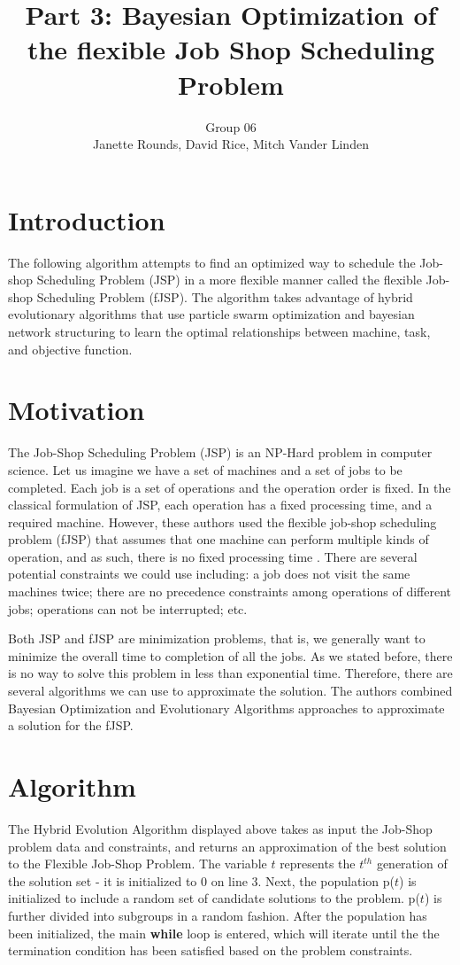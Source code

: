 \documentclass[11pt]{article}
\title{Part 3: Bayesian Optimization of the flexible Job Shop Scheduling Problem}
\author{Group 06 \\ 
\small Janette Rounds, \small David Rice, \small Mitch Vander Linden}
\begin{document}
\maketitle

\section{Introduction}
The following algorithm attempts to find an optimized way to schedule the Job-shop Scheduling Problem (JSP) in a more flexible manner called the flexible Job-shop Scheduling Problem (fJSP). The algorithm takes advantage of hybrid evolutionary algorithms that use particle swarm optimization and bayesian network structuring to learn the optimal relationships between machine, task, and objective function. 

\section{Motivation}
The Job-Shop Scheduling Problem (JSP) is an NP-Hard problem in computer science\cite{cheng1996tutorial}. Let us imagine we have a set of machines and a set of jobs to be completed. Each job is a set of operations and the operation order is fixed. In the classical formulation of JSP, each operation has a fixed processing time, and a required machine. However, these authors used the flexible job-shop scheduling problem (fJSP) that assumes that one machine can perform multiple kinds of operation, and as such, there is no fixed processing time \cite{sun2015bayesian}. There are several potential constraints we could use including: a job does not visit the same machines twice; there are no precedence constraints among operations of different jobs; operations can not be interrupted; etc. 

Both JSP and fJSP are minimization problems, that is, we generally want to minimize the overall time to completion of all the jobs. As we stated before, there is no way to solve this problem in less than exponential time. Therefore, there are several algorithms we can use to approximate the solution. The authors combined Bayesian Optimization and Evolutionary Algorithms approaches to approximate a solution for the fJSP. 

\section{Algorithm}

The Hybrid Evolution Algorithm displayed above takes as input the Job-Shop problem data and constraints, and returns an approximation of the best solution to the Flexible Job-Shop Problem. The variable $t$ represents the $t^{th}$ generation of the solution set - it is initialized to 0 on line 3. Next, the population p($t$) is initialized to include a random set of candidate solutions to the problem. p($t$) is further divided into subgroups in a random fashion. After the population has been initialized, the main \textbf{while} loop is entered, which will iterate until the the termination condition has been satisfied based on the problem constraints.
\end{document}
